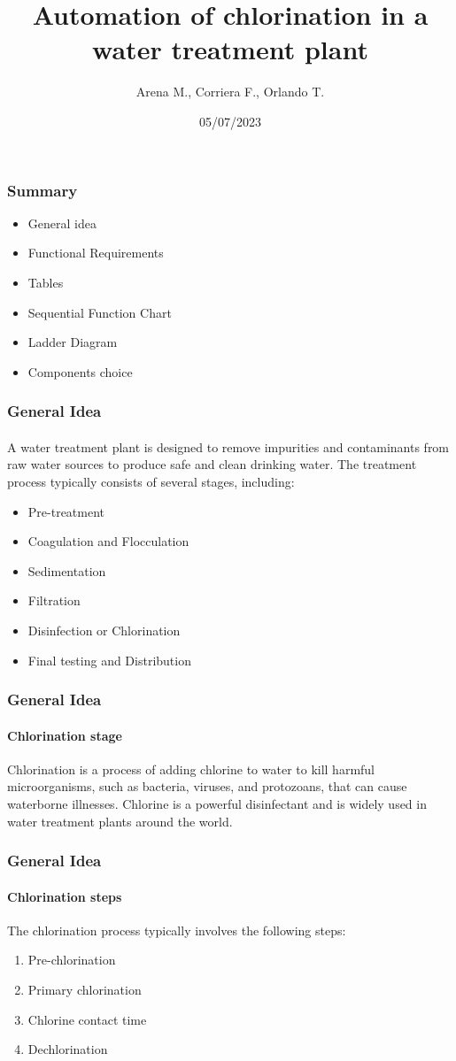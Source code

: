 \documentclass[12pt]{beamer}
\title{Automation of chlorination in a water treatment plant}
\author{Arena M., Corriera F., Orlando T.}
\institute{Università degli studi di Messina}
\date{05/07/2023}
\begin{document}
\begin{frame}
\maketitle
\end{frame}

\begin{frame}
\frametitle{Summary}
\begin{itemize}
\item General idea
\item Functional Requirements
\item Tables
\item Sequential Function Chart
\item Ladder Diagram
\item Components choice
\end{itemize}
\end{frame}

\begin{frame}
\frametitle{General Idea}
\framesubtitle{}
A water treatment plant is designed to remove impurities and contaminants from raw water sources to produce safe and clean drinking water. The treatment process typically consists of several stages, including:
\begin{itemize}
    \item Pre-treatment
    \item Coagulation and Flocculation
    \item Sedimentation
    \item Filtration
    \item Disinfection or Chlorination
    \item Final testing and Distribution
\end{itemize}
\end{frame}

\begin{frame}
\frametitle{General Idea}
\framesubtitle{Chlorination stage}
Chlorination is a process of adding chlorine to water to kill harmful microorganisms, such as bacteria, viruses, and protozoans, that can cause waterborne illnesses. Chlorine is a powerful disinfectant and is widely used in water treatment plants around the world.
\end{frame}

\begin{frame}
\frametitle{General Idea}
\framesubtitle{Chlorination steps}
The chlorination process typically involves the following steps:
\begin{enumerate}
    \item Pre-chlorination
    \item Primary chlorination
    \item Chlorine contact time
    \item Dechlorination
\end{enumerate}
\end{frame}
\end{document}
